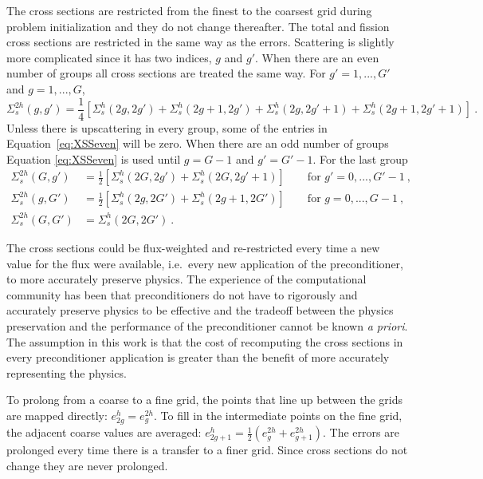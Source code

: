 The cross sections are restricted from the finest to the coarsest grid during problem initialization and they do not change thereafter. The total and fission cross sections are restricted in the same way as the errors. Scattering is slightly more complicated since it has two indices, $g$ and $g'$. When there are an even number of groups all cross sections are treated the same way. For $g' = 1,..., G'$ and $g = 1, ..., G$,
\begin{equation}
  \Sigma_s^{2h}(g,g') = \frac{1}{4}[\Sigma_s^{h}(2g,2g') + \Sigma_s^{h}(2g+1,2g') + \Sigma_s^{h}(2g,2g'+1) + \Sigma_s^{h}(2g+1,2g'+1)] \:. 
  \label{eq:XSSeven}
\end{equation}
% 
Unless there is upscattering in every group, some of the entries in Equation~\eqref{eq:XSSeven} will be zero. When there are an odd number of groups Equation \eqref{eq:XSSeven} is used until $g=G-1$ and $g'=G'-1$. For the last group
  \begin{align}
    \Sigma^{2h}_s(G,g') &= \frac{1}{2}[\Sigma^{h}_s(2G,2g') + \Sigma^{h}_s(2G,2g'+1)] \qquad \text{for } g' = 0,...,G'-1 \:,\nonumber \\
    \Sigma^{2h}_s(g,G') &=  \frac{1}{2}[\Sigma^{h}_s(2g,2G') + \Sigma^{h}_s(2g+1,2G')] \qquad \text{for } g  = 0,...,G-1 \:,\nonumber \\
    \Sigma^{2h}_s(G,G') &= \Sigma^{h}_s(2G,2G') \nonumber \:.
  \end{align}

The cross sections could be flux-weighted and re-restricted every time a new value for the flux were available, i.e.\ every new application of the preconditioner, to more accurately preserve physics. The experience of the computational community has been that preconditioners do not have to rigorously and accurately preserve physics to be effective and the tradeoff between the physics preservation and the performance of the preconditioner cannot be known \emph{a priori}. The assumption in this work is that the cost of recomputing the cross sections in every preconditioner application is greater than the benefit of more accurately representing the physics.

To prolong from a coarse to a fine grid, the points that line up between the grids are mapped directly: $e_{2g}^{h} = e_{g}^{2h}$. To fill in the intermediate points on the fine grid, the adjacent coarse values are averaged: $e_{2g+1}^{h} = \frac{1}{2}(e_{g}^{2h} + e_{g+1}^{2h})$. The errors are prolonged every time there is a transfer to a finer grid. Since cross sections do not change they are never prolonged. 

